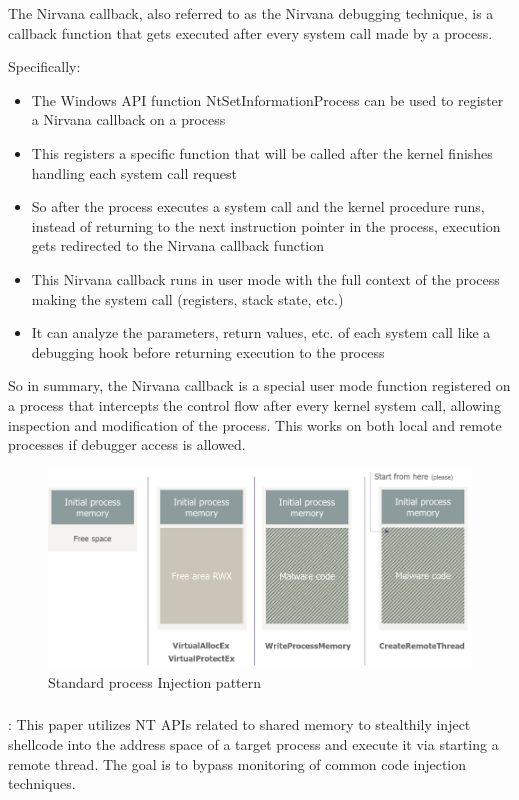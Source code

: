 \documentclass{article}
\begin{document}
The Nirvana callback, also referred to as the Nirvana debugging technique, is a callback function that gets executed after every system call made by a process.

Specifically:
\begin{itemize}
\item The Windows API function NtSetInformationProcess can be used to register a Nirvana callback on a process
\item This registers a specific function that will be called after the kernel finishes handling each system call request
\item So after the process executes a system call and the kernel procedure runs, instead of returning to the next instruction pointer in the process, execution gets redirected to the Nirvana callback function
\item This Nirvana callback runs in user mode with the full context of the process making the system call (registers, stack state, etc.)
\item It can analyze the parameters, return values, etc. of each system call like a debugging hook before returning execution to the process
\end{itemize}
  
  So in summary, the Nirvana callback is a special user mode function registered on a process that intercepts the control flow after every kernel system call, allowing inspection and modification of the process. This works on both local and remote processes if debugger access is allowed.


\begin{figure}[ht]
\includegraphics[scale=0.9]{dequeker_standard_process_injection_pattern.png}
\caption{Standard process Injection pattern \autocite{Dequeker:2023}}
\end{figure}
 

\subsubsection{\textcite{S12h4ck:2023a}}
\textbf{}:  This paper utilizes NT APIs related to shared memory to stealthily inject shellcode into the address space of a target process and execute it via starting a remote thread. The goal is to bypass monitoring of common code injection techniques.
\end{document}
